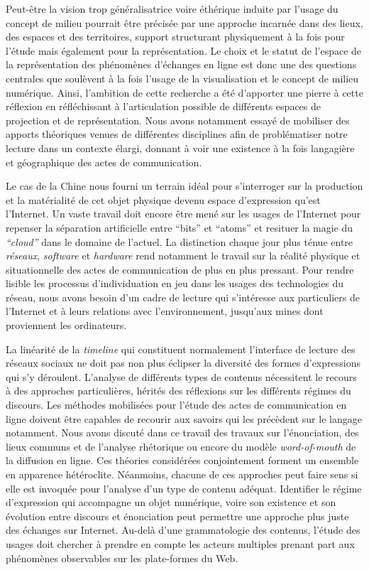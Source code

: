 Peut-être la vision trop généralisatrice voire éthérique induite par l{\textquoteright}usage du concept de milieu pourrait être précisée par une approche incarnée dans des lieux, des espaces et des territoires, support structurant physiquement à la fois pour l{\textquoteright}étude mais également pour la représentation. Le choix et le statut de l'espace de la représentation des phénomènes d'échanges en ligne est donc une des questions centrales que soulèvent à la fois l'usage de la visualisation et le concept de milieu numérique. Ainsi, l'ambition de cette recherche a été d'apporter une pierre à cette réflexion en réfléchissant à l'articulation possible de différents espaces de projection et de représentation. Nous avons notamment essayé de mobiliser des apports théoriques venues de différentes disciplines afin de problématiser notre lecture dans un contexte élargi, donnant à voir une existence à la fois langagière et géographique des actes de communication. 


Le cas de la Chine nous fourni un terrain idéal pour s'interroger sur la production et la matérialité de cet objet physique devenu espace d'expression qu'est l'Internet. Un vaste travail doit encore être mené sur les usages de l'Internet pour repenser  la séparation artificielle entre ``bits'' et ``atoms'' et resituer la magie du \textit{``cloud''} dans le domaine de l'actuel. La distinction chaque jour plus ténue entre \textit{réseaux}, \textit{software} et \textit{hardware} rend notamment le travail sur la réalité physique et situationnelle des actes de communication de plus en plus pressant. Pour rendre lisible les processus d'individuation en jeu dans les usages des technologies du réseau, nous avons besoin d'un cadre de lecture qui s'intéresse aux particuliers de l'Internet et à leurs relations avec l'environnement, jusqu'aux mines dont proviennent les ordinateurs.

La linéarité de la \textit{timeline} qui constituent normalement l'interface de lecture des réseaux sociaux ne doit pas non plus éclipser la diversité des formes d'expressions qui s'y déroulent. L'analyse de différents types de contenus nécessitent le recours à des approches particulières, hérités des réflexions sur les différents régimes du discours. Les méthodes mobilisées pour l'étude des actes de communication en ligne doivent être capables de recourir aux savoirs qui les précèdent sur le langage notamment. Nous avons discuté dans ce travail des travaux sur l'énonciation, des lieux communs et de l'analyse rhétorique ou encore du modèle \textit{word-of-mouth} de la diffusion en ligne. Ces théories considérées conjointement forment un ensemble en apparence hétéroclite. Néanmoins, chacune de ces approches peut faire sens si elle est invoquée pour l'analyse d'un type de contenu adéquat. Identifier le régime d'expression qui accompagne un objet numérique, voire son existence et son évolution entre discours et énonciation peut permettre une approche plus juste des échanges sur Internet. Au-delà d'une grammatologie des contenus, l'étude des usages doit chercher à prendre en compte les acteurs multiples prenant part aux phénomènes observables sur les plate-formes du Web. 

